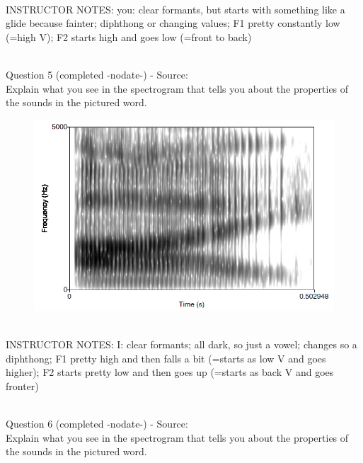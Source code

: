 \documentclass[12pt]{article}
\begin{document}
~\\
INSTRUCTOR NOTES: you: clear formants, but starts with something like a glide because fainter; diphthong or changing values; F1 pretty constantly low (=high V); F2 starts high and goes low (=front to back)


~\\

{\large Question 5} (completed -nodate-) - Source: \\

Explain what you see in the spectrogram that tells you about the properties of the sounds in the pictured word.\\

\begin{figure}[H]
\includegraphics{../images/spectrogram_I.png}
\end{figure}

~\\
INSTRUCTOR NOTES: I: clear formants; all dark, so just a vowel; changes so a diphthong; F1 pretty high and then falls a bit (=starts as low V and goes higher); F2 starts pretty low and then goes up (=starts as back V and goes fronter)


~\\

{\large Question 6} (completed -nodate-) - Source: \\

Explain what you see in the spectrogram that tells you about the properties of the sounds in the pictured word.\\
\end{document}
